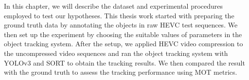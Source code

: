 In this chapter, we will describe the dataset and experimental procedures employed to test our hypotheses. This thesis work started with preparing the ground truth data by annotating the objects in raw HEVC test sequences. We then set up the experiment by choosing the suitable values of parameters in the object tracking system. After the setup, we applied HEVC video compression to the uncompressed video sequences and ran the object tracking system with YOLOv3 and SORT to obtain the tracking results. We then compared the result with the ground truth to assess the tracking performance using MOT metrics.